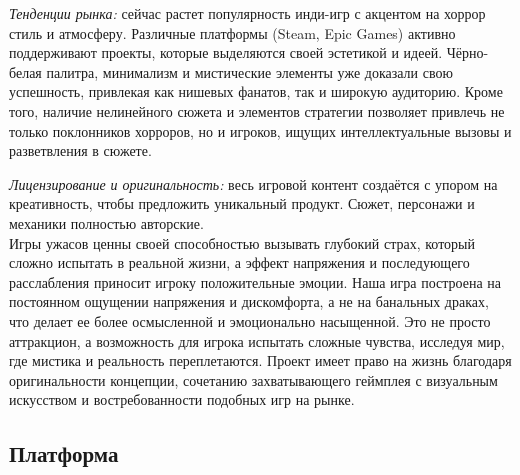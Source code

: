 \documentclass{article}
\begin{document}
	\textit{Тенденции рынка:} сейчас растет популярность инди-игр с акцентом на хоррор стиль и атмосферу. Различные платформы (Steam, Epic Games) активно поддерживают проекты, которые выделяются своей эстетикой и идеей. Чёрно-белая палитра, минимализм и мистические элементы уже доказали свою успешность, привлекая как нишевых фанатов, так и широкую аудиторию. Кроме того, наличие нелинейного сюжета и элементов стратегии позволяет привлечь не только поклонников хорроров, но и игроков, ищущих интеллектуальные вызовы и разветвления в сюжете.
	
	\textit{Лицензирование и оригинальность:} весь игровой контент создаётся с упором на креативность, чтобы предложить уникальный продукт. Сюжет, персонажи и механики полностью авторские. \\
	
	Игры ужасов ценны своей способностью вызывать глубокий страх, который сложно испытать в реальной жизни, а эффект напряжения и последующего расслабления приносит игроку положительные эмоции. Наша игра построена на постоянном ощущении напряжения и дискомфорта, а не на банальных драках, что делает ее более осмысленной и эмоционально насыщенной. Это не просто аттракцион, а возможность для игрока испытать сложные чувства, исследуя мир, где мистика и реальность переплетаются. Проект имеет право на жизнь благодаря оригинальности концепции, сочетанию захватывающего геймплея с визуальным искусством и востребованности подобных игр на рынке.

	\newpage
	\subsection{Платформа}
	
\end{document}
